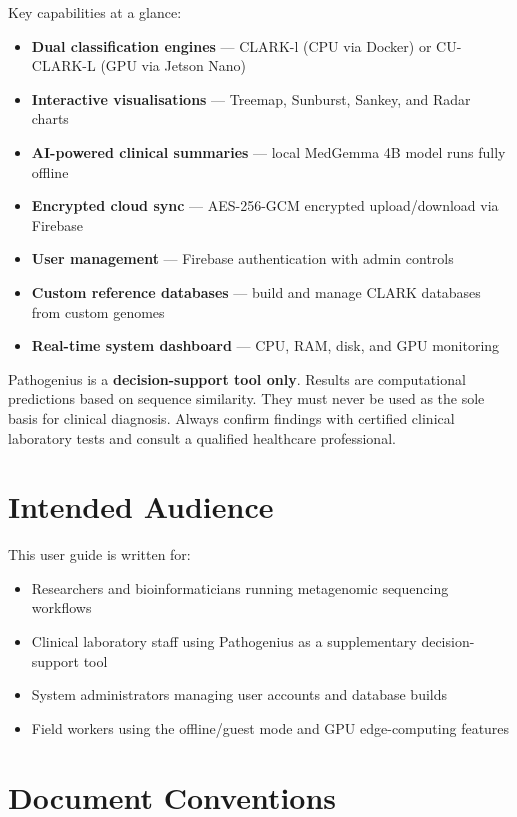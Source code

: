 \documentclass[12pt,a4paper]{report}
\begin{document}
Key capabilities at a glance:

\begin{itemize}[leftmargin=1.5em]
  \item \textbf{Dual classification engines} — CLARK-l (CPU via Docker) or CU-CLARK-L (GPU via Jetson Nano)
  \item \textbf{Interactive visualisations} — Treemap, Sunburst, Sankey, and Radar charts
  \item \textbf{AI-powered clinical summaries} — local MedGemma 4B model runs fully offline
  \item \textbf{Encrypted cloud sync} — AES-256-GCM encrypted upload/download via Firebase
  \item \textbf{User management} — Firebase authentication with admin controls
  \item \textbf{Custom reference databases} — build and manage CLARK databases from custom genomes
  \item \textbf{Real-time system dashboard} — CPU, RAM, disk, and GPU monitoring
\end{itemize}

\begin{importantbox}
  Pathogenius is a \textbf{decision-support tool only}. Results are computational predictions based on sequence similarity. They must never be used as the sole basis for clinical diagnosis. Always confirm findings with certified clinical laboratory tests and consult a qualified healthcare professional.
\end{importantbox}

\section{Intended Audience}

This user guide is written for:
\begin{itemize}[leftmargin=1.5em]
  \item Researchers and bioinformaticians running metagenomic sequencing workflows
  \item Clinical laboratory staff using Pathogenius as a supplementary decision-support tool
  \item System administrators managing user accounts and database builds
  \item Field workers using the offline/guest mode and GPU edge-computing features
\end{itemize}

\section{Document Conventions}
\end{document}
